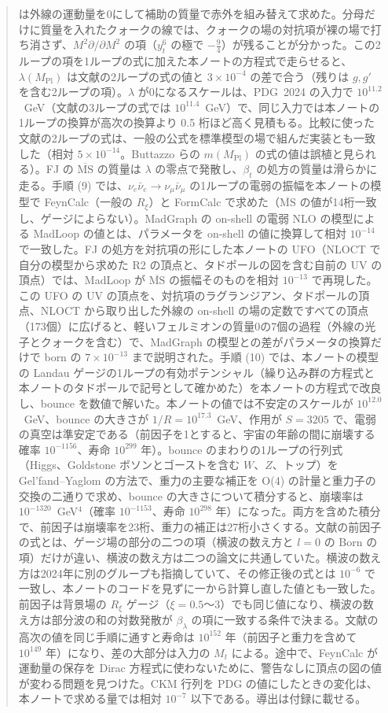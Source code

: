 \documentclass[a4paper,10pt]{ltjsarticle}
\newcommand{\MSbar}{\overline{\mathrm{MS}}}
\begin{document}
\begin{abstract}
は外線の運動量を0にして補助の質量で赤外を組み替えて求めた。分母だけに質量を入れたクォークの線では、クォークの場の対抗項が裸の場で打ち消さず、$M^2\partial/\partial M^2$ の項（$y_t^6$ の極で $-\frac94$）が残ることが分かった。この2ループの項を1ループの式に加えた本ノートの方程式で走らせると、$\lambda(M_{\mathrm{Pl}})$ は文献の2ループの式の値と $3\times10^{-4}$ の差で合う（残りは $g,g'$ を含む2ループの項）。$\lambda$ が0になるスケールは、PDG~2024 の入力で $10^{11.2}$~GeV（文献の3ループの式では $10^{11.4}$~GeV）で、同じ入力では本ノートの1ループの換算が高次の換算より 0.5 桁ほど高く見積もる。比較に使った文献の2ループの式は、一般の公式を標準模型の場で組んだ実装とも一致した（相対 $5\times10^{-14}$。Buttazzo らの $m(M_{\mathrm{Pl}})$ の式の値は誤植と見られる）。FJ の $\MSbar$ の質量は $\lambda$ の零点で発散し、$\beta_t$ の処方の質量は滑らかに走る。手順 (9) では、$\nu_e\bar\nu_e\to\nu_\mu\bar\nu_\mu$ の1ループの電弱の振幅を本ノートの模型で FeynCalc（一般の $R_\xi$）と FormCalc で求めた（$\MSbar$ の値が14桁一致し、ゲージによらない）。MadGraph の on-shell の電弱 NLO の模型による MadLoop の値とは、パラメータを on-shell の値に換算して相対 $10^{-14}$ で一致した。FJ の処方を対抗項の形にした本ノートの UFO（NLOCT で自分の模型から求めた R2 の頂点と、タドポールの図を含む自前の UV の頂点）では、MadLoop が $\MSbar$ の振幅そのものを相対 $10^{-13}$ で再現した。この UFO の UV の頂点を、対抗項のラグランジアン、タドポールの頂点、NLOCT から取り出した外線の on-shell の場の定数ですべての頂点（173個）に広げると、軽いフェルミオンの質量0の7個の過程（外線の光子とクォークを含む）で、MadGraph の模型との差がパラメータの換算だけで born の $7\times10^{-13}$ まで説明された。手順 (10) では、本ノートの模型の Landau ゲージの1ループの有効ポテンシャル（繰り込み群の方程式と本ノートのタドポールで記号として確かめた）を本ノートの方程式で改良し、bounce を数値で解いた。本ノートの値では不安定のスケールが $10^{12.0}$~GeV、bounce の大きさが $1/R=10^{17.3}$~GeV、作用が $S=3205$ で、電弱の真空は準安定である（前因子を1とすると、宇宙の年齢の間に崩壊する確率 $10^{-1156}$、寿命 $10^{299}$ 年）。bounce のまわりの1ループの行列式（Higgs、Goldstone ボソンとゴーストを含む $W$、$Z$、トップ）を Gel'fand--Yaglom の方法で、重力の主要な補正を O(4) の計量と重力子の交換の二通りで求め、bounce の大きさについて積分すると、崩壊率は $10^{-1320}$~GeV$^4$（確率 $10^{-1153}$、寿命 $10^{298}$ 年）になった。両方を含めた積分で、前因子は崩壊率を23桁、重力の補正は27桁小さくする。文献の前因子の式とは、ゲージ場の部分の二つの項（横波の数え方と $l=0$ の Born の項）だけが違い、横波の数え方は二つの論文に共通していた。横波の数え方は2024年に別のグループも指摘していて、その修正後の式とは $10^{-6}$ で一致し、本ノートのコードを見ずに一から計算し直した値とも一致した。前因子は背景場の $R_\xi$ ゲージ（$\xi=0.5$〜3）でも同じ値になり、横波の数え方は部分波の和の対数発散が $\beta_\lambda$ の項に一致する条件で決まる。文献の高次の値を同じ手順に通すと寿命は $10^{152}$ 年（前因子と重力を含めて $10^{149}$ 年）になり、差の大部分は入力の $M_t$ による。途中で、FeynCalc が運動量の保存を Dirac 方程式に使わないために、警告なしに頂点の図の値が変わる問題を見つけた。CKM 行列を PDG の値にしたときの変化は、本ノートで求める量では相対 $10^{-7}$ 以下である。導出は付録に載せる。
\end{abstract}
\end{document}
